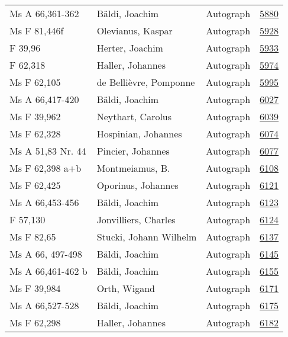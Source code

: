 \documentclass[10pt,a4paper,landscape]{report}
\begin{document}
\begin{longtable}{p{16cm}p{4cm}lr}
Ms A 66,361-362	&	Bäldi, Joachim	&	Autograph	&	\href{http://130.60.24.72/assignment/5880}{5880}\\
Ms F 81,446f	&	Olevianus, Kaspar	&	Autograph	&	\href{http://130.60.24.72/assignment/5928}{5928}\\
F 39,96	&	Herter, Joachim	&	Autograph	&	\href{http://130.60.24.72/assignment/5933}{5933}\\
F 62,318	&	Haller, Johannes	&	Autograph	&	\href{http://130.60.24.72/assignment/5974}{5974}\\
Ms F 62,105	&	de Bellièvre, Pomponne	&	Autograph	&	\href{http://130.60.24.72/assignment/5995}{5995}\\
Ms A 66,417-420	&	Bäldi, Joachim	&	Autograph	&	\href{http://130.60.24.72/assignment/6027}{6027}\\
Ms F 39,962	&	Neythart, Carolus	&	Autograph	&	\href{http://130.60.24.72/assignment/6039}{6039}\\
Ms F 62,328	&	Hospinian, Johannes	&	Autograph	&	\href{http://130.60.24.72/assignment/6074}{6074}\\
Ms A 51,83 Nr. 44	&	Pincier, Johannes	&	Autograph	&	\href{http://130.60.24.72/assignment/6077}{6077}\\
Ms F 62,398 a+b	&	Montmeiamus, B.	&	Autograph	&	\href{http://130.60.24.72/assignment/6108}{6108}\\
Ms F 62,425	&	Oporinus, Johannes	&	Autograph	&	\href{http://130.60.24.72/assignment/6121}{6121}\\
Ms A 66,453-456	&	Bäldi, Joachim	&	Autograph	&	\href{http://130.60.24.72/assignment/6123}{6123}\\
F 57,130	&	Jonvilliers, Charles	&	Autograph	&	\href{http://130.60.24.72/assignment/6124}{6124}\\
Ms F 82,65	&	Stucki, Johann Wilhelm	&	Autograph	&	\href{http://130.60.24.72/assignment/6137}{6137}\\
Ms A 66, 497-498	&	Bäldi, Joachim	&	Autograph	&	\href{http://130.60.24.72/assignment/6145}{6145}\\
Ms A 66,461-462 b	&	Bäldi, Joachim	&	Autograph	&	\href{http://130.60.24.72/assignment/6155}{6155}\\
Ms F 39,984	&	Orth, Wigand	&	Autograph	&	\href{http://130.60.24.72/assignment/6171}{6171}\\
Ms A 66,527-528	&	Bäldi, Joachim	&	Autograph	&	\href{http://130.60.24.72/assignment/6175}{6175}\\
Ms F 62,298	&	Haller, Johannes	&	Autograph	&	\href{http://130.60.24.72/assignment/6182}{6182}\\

\end{longtable}
\end{document}
